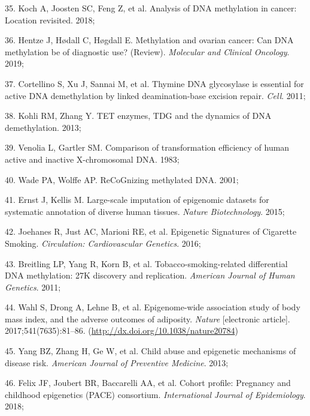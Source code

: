 \documentclass[11pt,twoside]{bristolthesis}
\newenvironment{cslreferences}%
  {}%
  {\par}
\begin{document}
\begin{cslreferences}
\leavevmode\hypertarget{ref-Koch2018}{}%
35. Koch A, Joosten SC, Feng Z, et al. Analysis of DNA methylation in cancer: Location revisited. 2018;

\leavevmode\hypertarget{ref-Hentze2019}{}%
36. Hentze J, Hødall C, Høgdall E. Methylation and ovarian cancer: Can DNA methylation be of diagnostic use? (Review). \emph{Molecular and Clinical Oncology}. 2019;

\leavevmode\hypertarget{ref-Cortellino2011}{}%
37. Cortellino S, Xu J, Sannai M, et al. Thymine DNA glycosylase is essential for active DNA demethylation by linked deamination-base excision repair. \emph{Cell}. 2011;

\leavevmode\hypertarget{ref-Kohli2013}{}%
38. Kohli RM, Zhang Y. TET enzymes, TDG and the dynamics of DNA demethylation. 2013;

\leavevmode\hypertarget{ref-Venolia1983}{}%
39. Venolia L, Gartler SM. Comparison of transformation efficiency of human active and inactive X-chromosomal DNA. 1983;

\leavevmode\hypertarget{ref-Wade2001}{}%
40. Wade PA, Wolffe AP. ReCoGnizing methylated DNA. 2001;

\leavevmode\hypertarget{ref-Ernst2015}{}%
41. Ernst J, Kellis M. Large-scale imputation of epigenomic datasets for systematic annotation of diverse human tissues. \emph{Nature Biotechnology}. 2015;

\leavevmode\hypertarget{ref-Joehanes2016}{}%
42. Joehanes R, Just AC, Marioni RE, et al. Epigenetic Signatures of Cigarette Smoking. \emph{Circulation: Cardiovascular Genetics}. 2016;

\leavevmode\hypertarget{ref-Breitling2011}{}%
43. Breitling LP, Yang R, Korn B, et al. Tobacco-smoking-related differential DNA methylation: 27K discovery and replication. \emph{American Journal of Human Genetics}. 2011;

\leavevmode\hypertarget{ref-Wahl2017}{}%
44. Wahl S, Drong A, Lehne B, et al. Epigenome-wide association study of body mass index, and the adverse outcomes of adiposity. \emph{Nature} {[}electronic article{]}. 2017;541(7635):81--86. (\url{http://dx.doi.org/10.1038/nature20784})

\leavevmode\hypertarget{ref-Yang2013}{}%
45. Yang BZ, Zhang H, Ge W, et al. Child abuse and epigenetic mechanisms of disease risk. \emph{American Journal of Preventive Medicine}. 2013;

\leavevmode\hypertarget{ref-Felix2018}{}%
46. Felix JF, Joubert BR, Baccarelli AA, et al. Cohort profile: Pregnancy and childhood epigenetics (PACE) consortium. \emph{International Journal of Epidemiology}. 2018;


\end{cslreferences}
\end{document}
